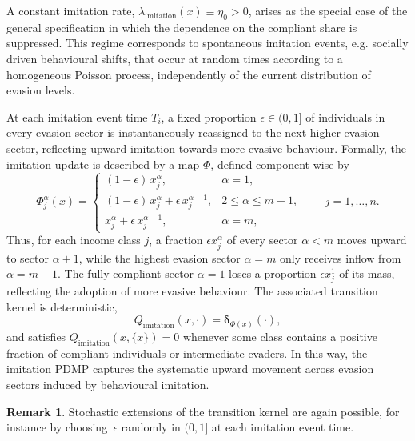 \documentclass[11pt]{article}
\theoremstyle{plain}
\theoremstyle{definition}
\newtheorem{remark}{Remark}
\newcommand{\1}{\mathbf{1}}
\begin{document}
A constant imitation rate, $\lambda_{\text{imitation}}(x)\equiv \eta_0>0$, arises as the special case of the general specification in which the dependence on the compliant share is suppressed. This regime corresponds to spontaneous imitation events, e.g. socially driven behavioural shifts, that occur at random times according to a homogeneous Poisson process, independently of the current distribution of evasion levels.

At each imitation event time $T_i$, a fixed proportion $\epsilon\in(0,1]$ of individuals in every evasion sector is instantaneously reassigned to the next higher evasion sector, reflecting upward imitation towards more evasive behaviour. Formally, the imitation update is described by a map $\Phi$, defined component-wise by
\begin{equation}\label{imitation_map}
  \Phi^\alpha_j(x) =
  \begin{cases}
    (1-\epsilon)\,x^\alpha_j, & \alpha=1,\\[0.8ex]
    (1-\epsilon)\,x^\alpha_j + \epsilon\,x_j^{\alpha-1}, & 2\le \alpha \le m-1,\\[1.0ex]
    x^\alpha_j + \epsilon\,x_j^{\alpha-1}, & \alpha=m,
  \end{cases}
  \qquad j=1,\dots,n.
\end{equation}
Thus, for each income class $j$, a fraction $\epsilon x_j^\alpha$ of every sector $\alpha<m$ moves upward to sector $\alpha+1$, while the highest evasion sector $\alpha=m$ only receives inflow from $\alpha=m-1$. The fully compliant sector $\alpha=1$ loses a proportion $\epsilon x_j^1$ of its mass, reflecting the adoption of more evasive behaviour. The associated transition kernel is deterministic,
\begin{equation*}
   Q_{\text{imitation}}(x,\cdot) = \boldsymbol{\delta}_{\Phi(x)}(\cdot), %
\end{equation*}
and satisfies $Q_{\text{imitation}}(x,\{x\})=0$ whenever %
some class contains a positive fraction of compliant individuals or intermediate evaders. In this way, the imitation PDMP captures the systematic upward movement across evasion sectors induced by behavioural imitation.

\begin{remark}
    Stochastic extensions of the transition kernel are again possible, for instance by choosing~$\epsilon$ randomly in $(0,1]$ at each imitation event time.
\end{remark}
\end{document}
